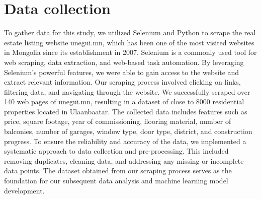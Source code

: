 \documentclass[11pt, a4paper, leqno]{article}
\begin{document}



%    




\section{Data collection} %
\label{sec:data_collection}
To gather data for this study, we utilized Selenium and Python to scrape the real estate listing website unegui.mn,
which has been one of the most visited websites in Mongolia since its establishment in 2007.
Selenium is a commonly used tool for web scraping, data extraction, and web-based task automation.
By leveraging Selenium's powerful features, we were able to gain access to the website and extract relevant information.
Our scraping process involved clicking on links, filtering data, and navigating through the website.
We successfully scraped over 140 web pages of unegui.mn, resulting in a dataset of close to 8000 residential properties located in Ulaanbaatar.
The collected data includes features such as price, square footage, year of commissioning, flooring material,
number of balconies, number of garages, window type, door type, district, and construction progress.
To ensure the reliability and accuracy of the data, we implemented a systematic approach to data collection and pre-processing.
This included removing duplicates, cleaning data, and addressing any missing or incomplete data points.
The dataset obtained from our scraping process serves as the foundation for our subsequent data analysis and machine learning model development.

\printbibliography
{}



\end{document}
